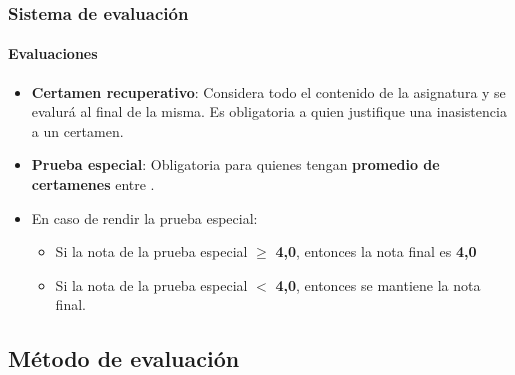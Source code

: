\documentclass{beamer}
\begin{document}
		\begin{frame}
			\frametitle{Sistema de evaluaci\'on}
			\framesubtitle{Evaluaciones}

			\begin{itemize}
				\item \textbf{Certamen recuperativo}: Considera todo el contenido de la asignatura y se evalur\'a al final de la misma. Es obligatoria a quien justifique una inasistencia a un certamen.
				\item \textbf{Prueba especial}: Obligatoria para quienes tengan \textbf{promedio de certamenes} entre \color{red}{3.5} \color{black}{y} \color{violet}{3.9}.
				\item En caso de rendir la prueba especial:
				\begin{itemize}
    				\item Si la nota de la prueba especial $\geq$ \textbf{4,0}, entonces la nota final es \textbf{4,0}
	    			\item Si la nota de la prueba especial $<$ \textbf{4,0}, entonces se mantiene la nota final.
				\end{itemize}
			\end{itemize}
		\end{frame}

		\subsection{M\'etodo de evaluaci\'on}
\end{document}
